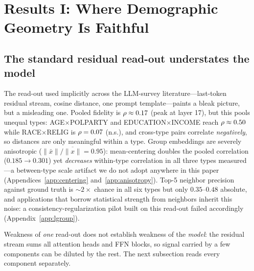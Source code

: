 \section{Results I: Where Demographic Geometry Is Faithful}
\label{sec:act2}

\subsection{The standard residual read-out understates the model}
\label{sec:act1}
The read-out used implicitly across the LLM-survey literature---last-token
residual stream, cosine distance, one prompt template---paints a bleak
picture, but a misleading one. Pooled fidelity is $\rho\approx0.17$
(peak at layer 17), but this pools unequal types: AGE$\times$POLPARTY
and EDUCATION$\times$INCOME reach $\rho\approx0.50$ while
RACE$\times$RELIG is $\rho=0.07$ (n.s.), and cross-type pairs correlate
\emph{negatively}, so distances are only meaningful within a type.
Group embeddings are severely anisotropic
($\lVert\bar{x}\rVert/\overline{\lVert x\rVert}=0.95$): mean-centering
doubles the pooled correlation ($0.185\!\to\!0.301$) yet \emph{decreases}
within-type correlation in all three types measured---a between-type
scale artifact we do not adopt anywhere in this paper
(Appendices~\ref{app:centering} and~\ref{app:anisotropy}). Top-5 neighbor
precision against ground truth is ${\sim}2\times$ chance in all six
types but only $0.35$--$0.48$ absolute, and applications that borrow
statistical strength from neighbors inherit this noise: a
consistency-regularization pilot built on this read-out failed
accordingly (Appendix~\ref{app:lgroup}).

Weakness of \emph{one} read-out does not establish weakness of the
\emph{model}: the residual stream sums all attention heads and FFN
blocks, so signal carried by a few components can be diluted by the
rest. The next subsection reads every component separately.

